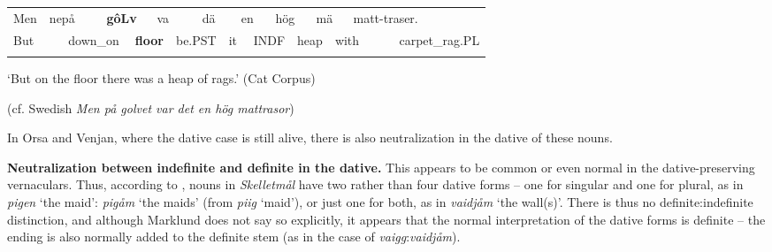 \begin{tabular}{llllllllllllllllll}
\lsptoprule
Men & \multicolumn{2}{l}{nepå

} & \multicolumn{2}{l}{{\bfseries gôLv}

} & \multicolumn{2}{l}{va

} & \multicolumn{2}{l}{dä

} & \multicolumn{2}{l}{en

} & \multicolumn{2}{l}{hög

} & \multicolumn{2}{l}{mä

} & \multicolumn{2}{l}{matt-traser.

} & \\
\multicolumn{2}{l}{But

} & \multicolumn{2}{l}{down\_on

} & \multicolumn{2}{l}{{\bfseries floor}

} & \multicolumn{2}{l}{be.PST

} & \multicolumn{2}{l}{it

} & \multicolumn{2}{l}{INDF

} & \multicolumn{2}{l}{heap

} & \multicolumn{2}{l}{with

} & \multicolumn{2}{l}{carpet\_rag.PL

}\\
\lspbottomrule
\end{tabular}

\begin{styleTranslation}
‘But on the floor there was a heap of rags.’ (Cat Corpus)

\end{styleTranslation}

(cf. Swedish \textit{Men på golvet var det en hög mattrasor})

\begin{styleBodyTextFirst}
In Orsa and Venjan, where the dative case is still alive, there is also neutralization in the dative of these nouns. 

\end{styleBodyTextFirst}

\begin{styleBodytextC}
\textbf{Neutralization between indefinite and definite in the dative.} This appears to be common or even normal in the dative-preserving vernaculars. Thus, according to \citet{Marklund1976}, nouns in \textit{Skelletmål} have two rather than four dative forms – one for singular and one for plural, as in \textit{pigen} ‘the maid’: \textit{pigåm} ‘the maids’ (from \textit{piig} ‘maid’), or just one for both, as in \textit{vaidjåm }‘the wall(s)’. There is thus no definite:indefinite distinction, and although Marklund does not say so explicitly, it appears that the normal interpretation of the dative forms is definite – the ending is also normally added to the definite stem (as in the case of \textit{vaigg}:\textit{vaidjåm}).

\end{styleBodytextC}

